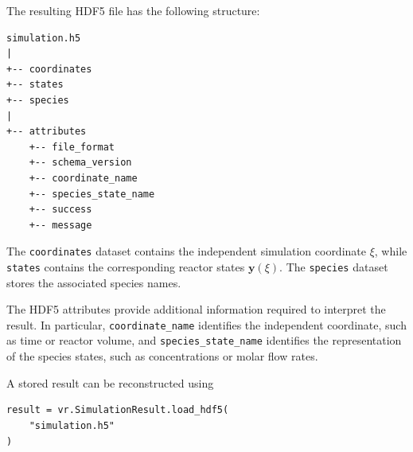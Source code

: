 The resulting HDF5 file has the following structure:

\begin{verbatim}
simulation.h5
|
+-- coordinates
+-- states
+-- species
|
+-- attributes
    +-- file_format
    +-- schema_version
    +-- coordinate_name
    +-- species_state_name
    +-- success
    +-- message
\end{verbatim}

The \texttt{coordinates} dataset contains the independent simulation
coordinate $\xi$, while \texttt{states} contains the corresponding reactor
states $\mathbf{y}(\xi)$. The \texttt{species} dataset stores the associated
species names.

The HDF5 attributes provide additional information required to interpret the
result. In particular, \texttt{coordinate\_name} identifies the independent
coordinate, such as time or reactor volume, and
\texttt{species\_state\_name} identifies the representation of the species
states, such as concentrations or molar flow rates.

A stored result can be reconstructed using

\begin{verbatim}
result = vr.SimulationResult.load_hdf5(
    "simulation.h5"
)
\end{verbatim}